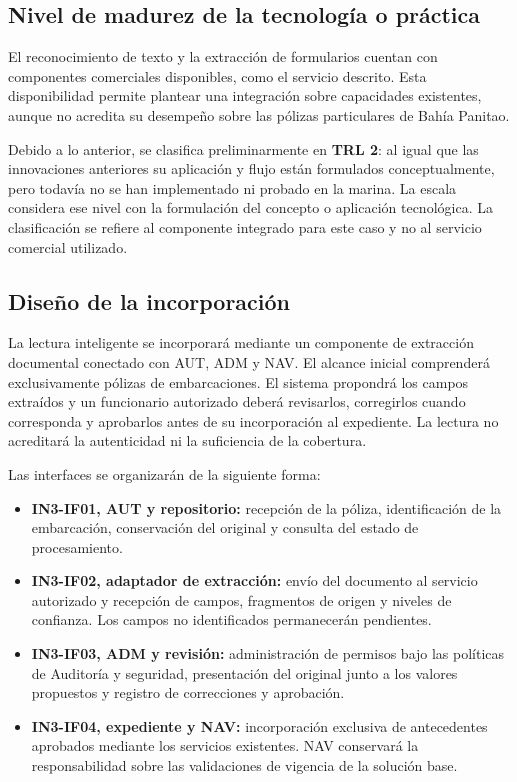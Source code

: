 \subsection{Nivel de madurez de la tecnología o práctica}

El reconocimiento de texto y la extracción de formularios cuentan con componentes comerciales disponibles, como el servicio descrito. Esta disponibilidad permite plantear una integración sobre capacidades existentes, aunque no acredita su desempeño sobre las pólizas particulares de Bahía Panitao.

Debido a lo anterior, se clasifica preliminarmente en \textbf{TRL 2}: al igual que las innovaciones anteriores su aplicación y flujo están formulados conceptualmente, pero todavía no se han implementado ni probado en la marina. La escala considera ese nivel con la formulación del concepto o aplicación tecnológica. La clasificación se refiere al componente integrado para este caso y no al servicio comercial utilizado.

\subsection{Diseño de la incorporación}

La lectura inteligente se incorporará mediante un componente de
extracción documental conectado con AUT, ADM y NAV. El alcance
inicial comprenderá exclusivamente pólizas de embarcaciones.
El sistema propondrá los campos extraídos y un funcionario
autorizado deberá revisarlos, corregirlos cuando corresponda
y aprobarlos antes de su incorporación al expediente. La lectura
no acreditará la autenticidad ni la suficiencia de la cobertura.

Las interfaces se organizarán de la siguiente forma:

\begin{itemize}
    \item \textbf{IN3-IF01, AUT y repositorio:} recepción de la póliza,
    identificación de la embarcación, conservación del original
    y consulta del estado de procesamiento.

    \item \textbf{IN3-IF02, adaptador de extracción:} envío del documento
    al servicio autorizado y recepción de campos, fragmentos de
    origen y niveles de confianza. Los campos no identificados
    permanecerán pendientes.

    \item \textbf{IN3-IF03, ADM y revisión:} administración de permisos
    bajo las políticas de Auditoría y seguridad,
    presentación del original junto a los valores propuestos
    y registro de correcciones y aprobación.

    \item \textbf{IN3-IF04, expediente y NAV:} incorporación exclusiva
    de antecedentes aprobados mediante los servicios existentes.
    NAV conservará la responsabilidad sobre las validaciones
    de vigencia de la solución base.
\end{itemize}

